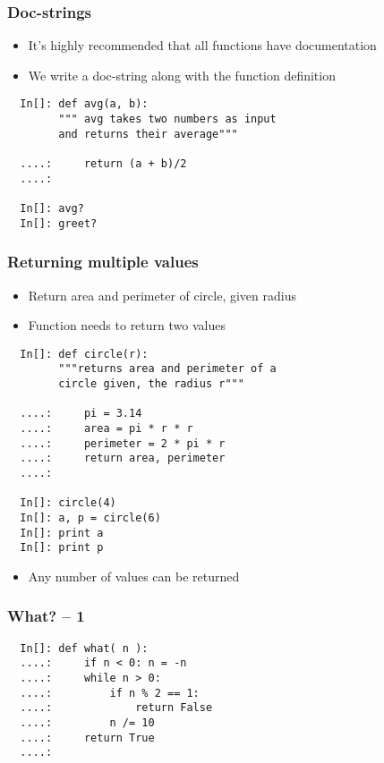\begin{frame}[fragile]
  \frametitle{Doc-strings}
  \begin{itemize}
  \item It's highly recommended that all functions have documentation
  \item We write a doc-string along with the function definition
  \end{itemize}
  \begin{lstlisting}
  In[]: def avg(a, b):
        """ avg takes two numbers as input 
        and returns their average"""

  ....:     return (a + b)/2
  ....:
        
  In[]: avg?
  In[]: greet?
  \end{lstlisting}
\end{frame}

\begin{frame}[fragile]
  \frametitle{Returning multiple values}
  \begin{itemize}
  \item Return area and perimeter of circle, given radius
  \item Function needs to return two values
  \end{itemize}
  \begin{lstlisting}
  In[]: def circle(r):
        """returns area and perimeter of a 
        circle given, the radius r"""

  ....:     pi = 3.14
  ....:     area = pi * r * r
  ....:     perimeter = 2 * pi * r
  ....:     return area, perimeter
  ....:

  In[]: circle(4)
  In[]: a, p = circle(6)
  In[]: print a
  In[]: print p
  \end{lstlisting}
  \begin{itemize}
  \item Any number of values can be returned
  \end{itemize}
\end{frame}

\begin{frame}[fragile]
  \frametitle{What? -- 1}
  \begin{lstlisting}       
  In[]: def what( n ):           
  ....:     if n < 0: n = -n     
  ....:     while n > 0:         
  ....:         if n % 2 == 1:   
  ....:             return False 
  ....:         n /= 10          
  ....:     return True          
  ....:
  \end{lstlisting}         
\end{frame}

